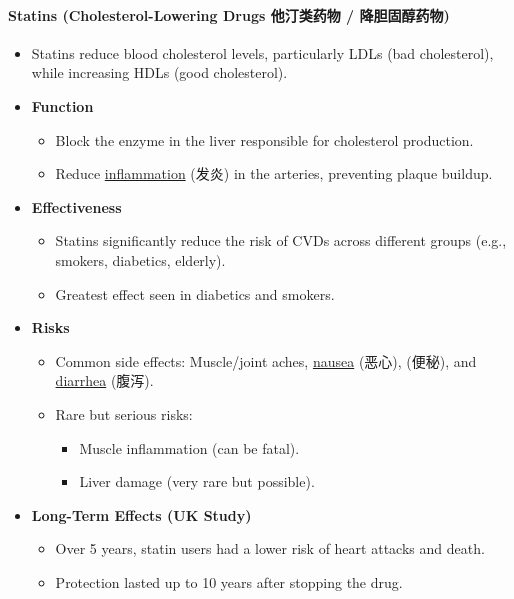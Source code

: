 \paragraph{Statins (Cholesterol-Lowering Drugs 他汀类药物 / 降胆固醇药物)}
\begin{itemize}
    \item Statins reduce blood cholesterol levels, particularly LDLs (bad cholesterol), while increasing HDLs (good cholesterol).
    \item \textbf{Function}
    \begin{itemize}
        \item Block the enzyme in the liver responsible for cholesterol production.
        \item Reduce \underline{inflammation} (发炎) in the arteries, preventing plaque buildup.
    \end{itemize}
    \item \textbf{Effectiveness}
    \begin{itemize}
        \item Statins significantly reduce the risk of CVDs across different groups (e.g., smokers, diabetics, elderly).
        \item Greatest effect seen in diabetics and smokers.
    \end{itemize}
    \item \textbf{Risks}
    \begin{itemize}
        \item Common side effects: Muscle/joint aches, \underline{nausea} (恶心),  (便秘), and
        \underline{diarrhea} (腹泻).
        \item Rare but serious risks:
        \begin{itemize}
            \item Muscle inflammation (can be fatal).
            \item Liver damage (very rare but possible).
        \end{itemize}
    \end{itemize}
    \item \textbf{Long-Term Effects (UK Study)}
    \begin{itemize}
        \item Over 5 years, statin users had a lower risk of heart attacks and death.
        \item Protection lasted up to 10 years after stopping the drug.
    \end{itemize}
\end{itemize}

